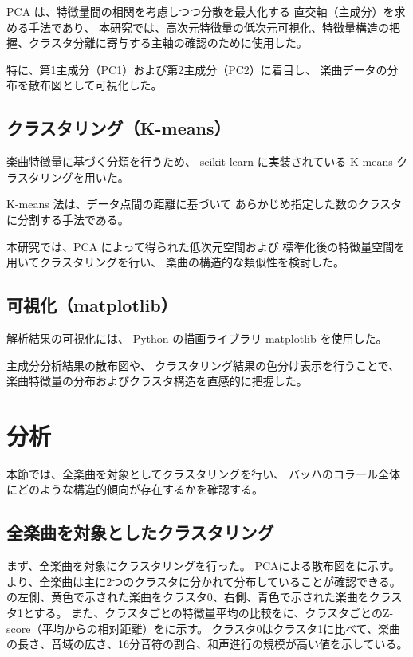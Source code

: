 PCA は、特徴量間の相関を考慮しつつ分散を最大化する
直交軸（主成分）を求める手法であり、
本研究では、高次元特徴量の低次元可視化、特徴量構造の把握、クラスタ分離に寄与する主軸の確認のために使用した。

特に、第1主成分（PC1）および第2主成分（PC2）に着目し、
楽曲データの分布を散布図として可視化した。

\subsection{クラスタリング（K-means）}

楽曲特徴量に基づく分類を行うため、
scikit-learn に実装されている K-means クラスタリングを用いた。

K-means 法は、データ点間の距離に基づいて
あらかじめ指定した数のクラスタに分割する手法である。

本研究では、PCA によって得られた低次元空間および
標準化後の特徴量空間を用いてクラスタリングを行い、
楽曲の構造的な類似性を検討した。

\subsection{可視化（matplotlib）}

解析結果の可視化には、
Python の描画ライブラリ matplotlib を使用した。

主成分分析結果の散布図や、
クラスタリング結果の色分け表示を行うことで、
楽曲特徴量の分布およびクラスタ構造を直感的に把握した。



\section{分析}





本節では、全楽曲を対象としてクラスタリングを行い、
バッハのコラール全体にどのような構造的傾向が存在するかを確認する。

\subsection{全楽曲を対象としたクラスタリング}
まず、全楽曲を対象にクラスタリングを行った。
PCAによる散布図をに示す。
より、全楽曲は主に2つのクラスタに分かれて分布していることが確認できる。
の左側、黄色で示された楽曲をクラスタ0、右側、青色で示された楽曲をクラスタ1とする。
また、クラスタごとの特徴量平均の比較をに、クラスタごとのZ-score（平均からの相対距離）をに示す。
クラスタ0はクラスタ1に比べて、楽曲の長さ、音域の広さ、16分音符の割合、和声進行の規模が高い値を示している。


